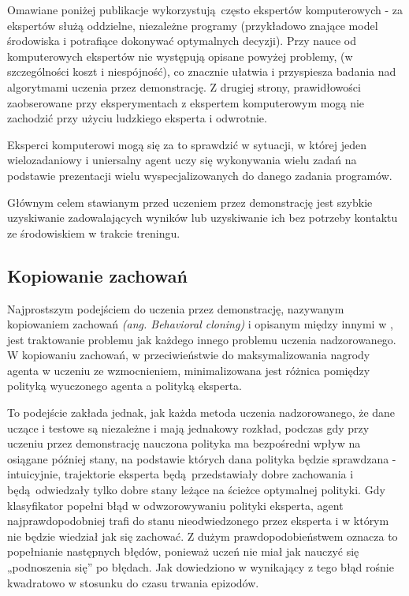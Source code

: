 Omawiane poniżej publikacje wykorzystują często ekspertów komputerowych - za ekspertów służą oddzielne, niezależne programy (przykładowo znające model środowiska i potrafiące dokonywać optymalnych decyzji). Przy nauce od komputerowych ekspertów nie występują opisane powyżej problemy, (w szczególności koszt i niespójność), co znacznie ułatwia i przyspiesza badania nad algorytmami uczenia przez demonstrację. Z drugiej strony, prawidłowości zaobserowane przy eksperymentach z ekspertem komputerowym mogą nie zachodzić przy użyciu ludzkiego eksperta i odwrotnie.

Eksperci komputerowi mogą się za to sprawdzić w sytuacji, w której jeden wielozadaniowy i uniersalny agent uczy się wykonywania wielu zadań na podstawie prezentacji wielu wyspecjalizowanych do danego zadania programów.

Głównym celem stawianym przed uczeniem przez demonstrację jest szybkie uzyskiwanie zadowalających wyników lub uzyskiwanie ich bez potrzeby kontaktu ze środowiskiem w trakcie treningu.

\subsection{Kopiowanie zachowań}\label{bcloning}

Najprostszym podejściem do uczenia przez demonstrację, nazywanym kopiowaniem zachowań \textit{(ang. Behavioral cloning)} i opisanym między innymi w \cite{Schaal99isimitation}, jest traktowanie problemu jak każdego innego problemu uczenia nadzorowanego. W kopiowaniu zachowań, w przeciwieństwie do maksymalizowania nagrody agenta w uczeniu ze wzmocnieniem, minimalizowana jest różnica pomiędzy polityką wyuczonego agenta a polityką eksperta.

To podejście zakłada jednak, jak każda metoda uczenia nadzorowanego, że dane uczące i testowe są niezależne i mają jednakowy rozkład, podczas gdy przy uczeniu przez demonstrację nauczona polityka ma bezpośredni wpływ na osiągane później stany, na podstawie których dana polityka będzie sprawdzana - intuicyjnie, trajektorie eksperta będą przedstawiały dobre zachowania i będą odwiedzały tylko dobre stany leżące na ścieżce optymalnej polityki. Gdy klasyfikator popełni błąd w odwzorowywaniu polityki eksperta, agent najprawdopodobniej trafi do stanu nieodwiedzonego przez eksperta i w którym nie będzie wiedział jak się zachować. Z dużym prawdopodobieństwem oznacza to popełnianie następnych błędów, ponieważ uczeń nie miał jak nauczyć się „podnoszenia się” po błędach. Jak dowiedziono w \cite{bagnell2010efficient} wynikający z tego błąd rośnie kwadratowo w stosunku do czasu trwania epizodów.

